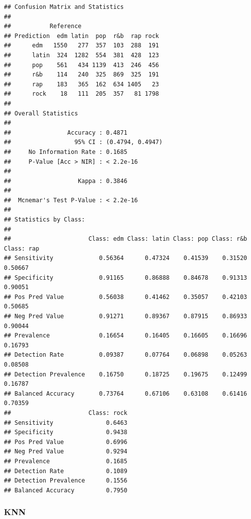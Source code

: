 \documentclass[
]{article}
\begin{document}
\begin{verbatim}
## Confusion Matrix and Statistics
## 
##           Reference
## Prediction  edm latin  pop  r&b  rap rock
##      edm   1550   277  357  103  288  191
##      latin  324  1282  554  381  428  123
##      pop    561   434 1139  413  246  456
##      r&b    114   240  325  869  325  191
##      rap    183   365  162  634 1405   23
##      rock    18   111  205  357   81 1798
## 
## Overall Statistics
##                                           
##                Accuracy : 0.4871          
##                  95% CI : (0.4794, 0.4947)
##     No Information Rate : 0.1685          
##     P-Value [Acc > NIR] : < 2.2e-16       
##                                           
##                   Kappa : 0.3846          
##                                           
##  Mcnemar's Test P-Value : < 2.2e-16       
## 
## Statistics by Class:
## 
##                      Class: edm Class: latin Class: pop Class: r&b Class: rap
## Sensitivity             0.56364      0.47324    0.41539    0.31520    0.50667
## Specificity             0.91165      0.86888    0.84678    0.91313    0.90051
## Pos Pred Value          0.56038      0.41462    0.35057    0.42103    0.50685
## Neg Pred Value          0.91271      0.89367    0.87915    0.86933    0.90044
## Prevalence              0.16654      0.16405    0.16605    0.16696    0.16793
## Detection Rate          0.09387      0.07764    0.06898    0.05263    0.08508
## Detection Prevalence    0.16750      0.18725    0.19675    0.12499    0.16787
## Balanced Accuracy       0.73764      0.67106    0.63108    0.61416    0.70359
##                      Class: rock
## Sensitivity               0.6463
## Specificity               0.9438
## Pos Pred Value            0.6996
## Neg Pred Value            0.9294
## Prevalence                0.1685
## Detection Rate            0.1089
## Detection Prevalence      0.1556
## Balanced Accuracy         0.7950
\end{verbatim}

\hypertarget{knn}{%
\subsubsection{KNN}\label{knn}}
\end{document}
